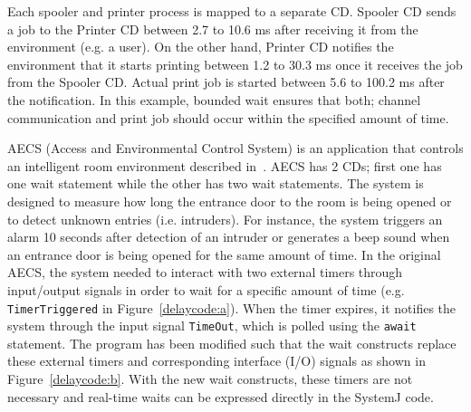  Each spooler and printer process is mapped to a separate
CD. Spooler CD sends a job to the Printer CD between 2.7 to 10.6 ms
after receiving it from the environment (e.g. a user). On the other
hand, Printer CD notifies the environment that it starts printing
between 1.2 to 30.3 ms once it receives the job from the Spooler CD.
Actual print job is started between 5.6 to 100.2 ms after the
notification. In this example, bounded wait ensures that both; channel
communication and print job should occur within the specified amount of
time. %

AECS (Access and Environmental Control System) is an application that
controls an intelligent room environment described in~\cite{aecs_ispa}.
AECS has 2 CDs; first one has one wait statement while the other has two
wait statements. The system is designed to measure how long the entrance
door to the room is being opened or to detect unknown entries (i.e.
intruders). For instance, the system triggers an alarm 10 seconds after
detection of an intruder or generates a beep sound when an entrance door
is being opened for the same amount of time. In the original AECS, the
system needed to interact with two external timers through input/output
signals in order to wait for a specific amount of time (e.g.
\texttt{TimerTriggered} in Figure~\ref{delaycode:a}). When the timer
expires, it notifies the system through the input signal
\texttt{TimeOut}, which is polled using the \texttt{await} statement.
The program has been modified such that the wait constructs replace
these external timers and corresponding interface (I/O) signals as shown
in Figure~\ref{delaycode:b}. With the new wait constructs, these timers
are not necessary and real-time waits can be expressed directly in the
SystemJ code.

